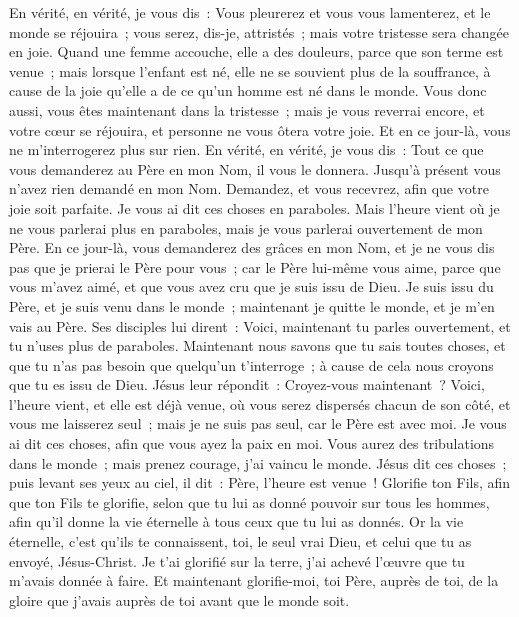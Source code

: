 \begin{multicols}{2}
En vérité, en vérité, je vous dis~: Vous pleurerez et vous vous lamenterez, et le monde se réjouira~; vous serez, dis-je, attristés~; mais votre tristesse sera changée en joie.
Quand une femme accouche, elle a des douleurs, parce que son terme est venue~; mais lorsque l'enfant est né, elle ne se souvient plus de la souffrance, à cause de la joie qu'elle a de ce qu'un homme est né dans le monde.
Vous donc aussi, vous êtes maintenant dans la tristesse~; mais je vous reverrai encore, et votre cœur se réjouira, et personne ne vous ôtera votre joie.
Et en ce jour-là, vous ne m'interrogerez plus sur rien. En vérité, en vérité, je vous dis~: Tout ce que vous demanderez au Père en mon Nom, il vous le donnera.
Jusqu'à présent vous n'avez rien demandé en mon Nom. Demandez, et vous recevrez, afin que votre joie soit parfaite.
Je vous ai dit ces choses en paraboles. Mais l'heure vient où je ne vous parlerai plus en paraboles, mais je vous parlerai ouvertement de mon Père.
En ce jour-là, vous demanderez des grâces en mon Nom, et je ne vous dis pas que je prierai le Père pour vous~;
car le Père lui-même vous aime, parce que vous m'avez aimé, et que vous avez cru que je suis issu de Dieu.
Je suis issu du Père, et je suis venu dans le monde~; maintenant je quitte le monde, et je m'en vais au Père.
Ses disciples lui dirent~: Voici, maintenant tu parles ouvertement, et tu n'uses plus de paraboles.
Maintenant nous savons que tu sais toutes choses, et que tu n'as pas besoin que quelqu'un t'interroge~; à cause de cela nous croyons que tu es issu de Dieu.
Jésus leur répondit~: Croyez-vous maintenant~?
Voici, l'heure vient, et elle est déjà venue, où vous serez dispersés chacun de son côté, et vous me laisserez seul~; mais je ne suis pas seul, car le Père est avec moi.
Je vous ai dit ces choses, afin que vous ayez la paix en moi. Vous aurez des tribulations dans le monde~; mais prenez courage, j'ai vaincu le monde.
\VerseOne{}Jésus dit ces choses~; puis levant ses yeux au ciel, il dit~: Père, l'heure est venue~! Glorifie ton Fils, afin que ton Fils te glorifie,
selon que tu lui as donné pouvoir sur tous les hommes, afin qu'il donne la vie éternelle à tous ceux que tu lui as donnés.
Or la vie éternelle, c'est qu'ils te connaissent, toi, le seul vrai Dieu, et celui que tu as envoyé, Jésus-Christ.
Je t'ai glorifié sur la terre, j'ai achevé l'œuvre que tu m'avais donnée à faire.
Et maintenant glorifie-moi, toi Père, auprès de toi, de la gloire que j'avais auprès de toi avant que le monde soit.

\end{multicols}
